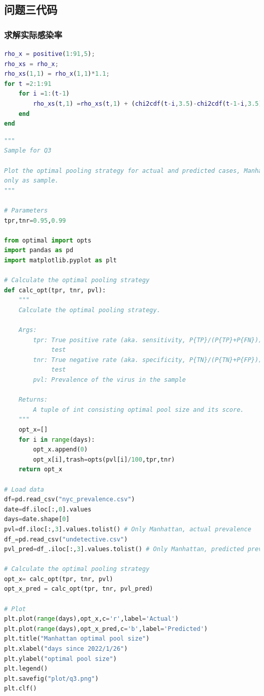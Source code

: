 \documentclass[withoutpreface,bwprint]{cumcmthesis} %
\begin{document}
\begin{appendices}
\subsection{问题三代码}
\subsubsection{求解实际感染率}
\begin{lstlisting}[language=matlab]
rho_x = positive(1:91,5);
rho_xs = rho_x;
rho_xs(1,1) = rho_x(1,1)*1.1;
for t =2:1:91
    for i =1:(t-1)
        rho_xs(t,1) =rho_xs(t,1) + (chi2cdf(t-i,3.5)-chi2cdf(t-1-i,3.5))*(rho_xs(i,1) - rho_x(i,1));
    end
end
\end{lstlisting}

\begin{lstlisting}[language=python]
"""
Sample for Q3

Plot the optimal pooling strategy for actual and predicted cases, Manhattan
only as sample.
"""

# Parameters
tpr,tnr=0.95,0.99

from optimal import opts
import pandas as pd
import matplotlib.pyplot as plt

# Calculate the optimal pooling strategy
def calc_opt(tpr, tnr, pvl):
    """
    Calculate the optimal pooling strategy.

    Args:
        tpr: True positive rate (aka. sensitivity, P{TP}/(P{TP}+P{FN})) of the
             test
        tnr: True negative rate (aka. specificity, P{TN}/(P{TN}+P{FP})) of the
             test
        pvl: Prevalence of the virus in the sample

    Returns:
        A tuple of int consisting optimal pool size and its score.
    """
    opt_x=[]
    for i in range(days):
        opt_x.append(0)
        opt_x[i],trash=opts(pvl[i]/100,tpr,tnr)
    return opt_x

# Load data
df=pd.read_csv("nyc_prevalence.csv")
date=df.iloc[:,0].values
days=date.shape[0]
pvl=df.iloc[:,3].values.tolist() # Only Manhattan, actual prevalence
df_=pd.read_csv("undetective.csv")
pvl_pred=df_.iloc[:,3].values.tolist() # Only Manhattan, predicted prevalence

# Calculate the optimal pooling strategy
opt_x= calc_opt(tpr, tnr, pvl)
opt_x_pred = calc_opt(tpr, tnr, pvl_pred)

# Plot
plt.plot(range(days),opt_x,c='r',label='Actual')
plt.plot(range(days),opt_x_pred,c='b',label='Predicted')
plt.title("Manhattan optimal pool size")
plt.xlabel("days since 2022/1/26")
plt.ylabel("optimal pool size")
plt.legend()
plt.savefig("plot/q3.png")
plt.clf()
\end{lstlisting}

\end{appendices}
\end{document}
